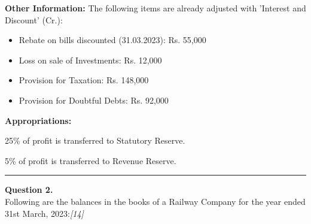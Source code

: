 \documentclass[11pt,a4paper]{article}
\newcommand{\pts}[1]{\hfill   \textit{[#1]}}
\begin{document}
   \textbf{Other Information:} The following items are already adjusted with 'Interest and Discount' (Cr.):

\begin{itemize}[leftmargin=*]
  \item Rebate on bills discounted (31.03.2023): Rs. 55,000
  \item Loss on sale of Investments: Rs. 12,000
  \item Provision for Taxation: Rs. 148,000
  \item Provision for Doubtful Debts: Rs. 92,000
\end{itemize}
   \textbf{Appropriations:}

\begin{parts}
  \item 25\% of profit is transferred to Statutory Reserve.
  \item 5\% of profit is transferred to Revenue Reserve.
\end{parts}

\medskip\rule{\linewidth}{0.2pt}

\pagebreak




\noindent   \textbf{Question 2.} \\
Following are the balances in the books of a Railway Company for the year ended 31st March, 2023:\pts{14}
\end{document}
